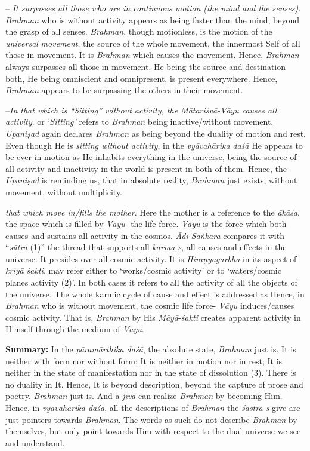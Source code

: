  -- \emph{It surpasses all those who are in continuous motion (the mind and the senses).} \emph{Brahman} who is without activity appears as being faster than the mind, beyond the grasp of all senses. \emph{Brahman}, though motionless, is the motion of the \emph{universal} \emph{movement}, the source of the whole movement, the innermost Self of all those in movement. It is \emph{Brahman} which causes the movement. Hence, \emph{Brahman} always surpasses all those in movement. He being the source and destination both, He being omniscient and omnipresent, is present everywhere. Hence, \emph{Brahman} appears to be surpassing the others in their movement.

 --\emph{In that which is ``Sitting'' without activity, the Mātariśvā-Vāyu causes all activity}.  or `\emph{Sitting'} refers to \emph{Brahman} being inactive/without movement. \emph{Upaniṣad} again declares \emph{Brahman} as being beyond the duality of motion and rest. Even though He is \emph{sitting without activity}, in the \emph{vyāvahārika} \emph{daśā} He appears to be ever in motion as He inhabits everything in the universe, being the source of all activity and inactivity in the world is present in both of them. Hence, the \emph{Upaniṣad} is reminding us, that in absolute reality, \emph{Brahman} just exists, without movement, without multiplicity.

 \emph{that which move in/fills the mother}. Here the mother is a reference to the \emph{ākāśa}, the space which is filled by \emph{Vāyu} -the life force. \emph{Vāyu} is the force which both causes and sustains all activity in the cosmos. \emph{Ādi Saṅkara} compares it with ``\emph{sūtra} (1)'' the thread that supports all \emph{karma-s}, all causes and effects in the universe. It presides over all cosmic activity. It is \emph{Hiraṇyagarbha} in its aspect of \emph{kriyā śakti}.  may refer either to `works/cosmic activity' or to `waters/cosmic planes activity (2)'. In both cases it refers to all the activity of all the objects of the universe. The whole karmic cycle of cause and effect is addressed as  Hence, in \emph{Brahman} who is without movement, the cosmic life force- \emph{Vāyu} induces/causes cosmic activity. That is, \emph{Brahman} by His \emph{Māyā}-\emph{śakti} creates apparent activity in Himself through the medium of \emph{Vāyu}.

\textbf{Summary:} In the \emph{pāramārthika daśā}, the absolute state, \emph{Brahman} just is. It is neither with form nor without form; It is neither in motion nor in rest; It is neither in the state of manifestation nor in the state of dissolution (3). There is no duality in It. Hence, It is beyond description, beyond the capture of prose and poetry. \emph{Brahman} just is. And a \emph{jīva} can realize \emph{Brahman} by becoming Him. Hence, in \emph{vyāvahārika daśā}, all the descriptions of \emph{Brahman} the \emph{śāstra-s} give are just pointers towards \emph{Brahman}. The words as such do not describe \emph{Brahman} by themselves, but only point towards Him with respect to the dual universe we see and understand.

